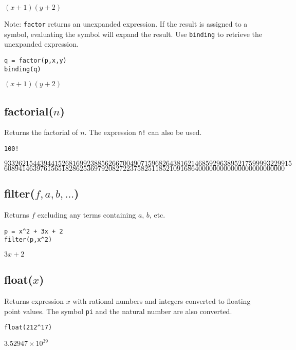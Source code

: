 \noindent
$\displaystyle (x+1)(y+2)$

\bigskip
\noindent
Note:
\verb$factor$
returns an unexpanded expression.
If the result is assigned to a symbol, evaluating the symbol will expand the result.
Use
\verb$binding$
to retrieve the unexpanded expression.

{\color{blue}
\begin{verbatim}
q = factor(p,x,y)
binding(q)
\end{verbatim}
}

\noindent
$\displaystyle (x+1)(y+2)$

\subsection*{factorial($n$)}

Returns the factorial of $n$.
The expression {\tt n!} can also be used.

{\color{blue}
\begin{verbatim}
100!
\end{verbatim}
}

\noindent
$93326215443944152681699238856266700490715968264381621468592963895217599993229915$\\
$608941463976156518286253697920827223758251185210916864000000000000000000000000$

\subsection*{filter($f,a,b,\ldots$)}

Returns $f$ excluding any terms containing $a$, $b$, etc.

{\color{blue}
\begin{verbatim}
p = x^2 + 3x + 2
filter(p,x^2)
\end{verbatim}
}

\noindent
$3x+2$

\subsection*{float($x$)}

Returns expression $x$ with rational numbers and integers converted to
floating point values.
The symbol {\tt pi} and the natural number are also converted.

{\color{blue}
\begin{verbatim}
float(212^17)
\end{verbatim}
}

\noindent
$\displaystyle 3.52947\times 10^{39}$


